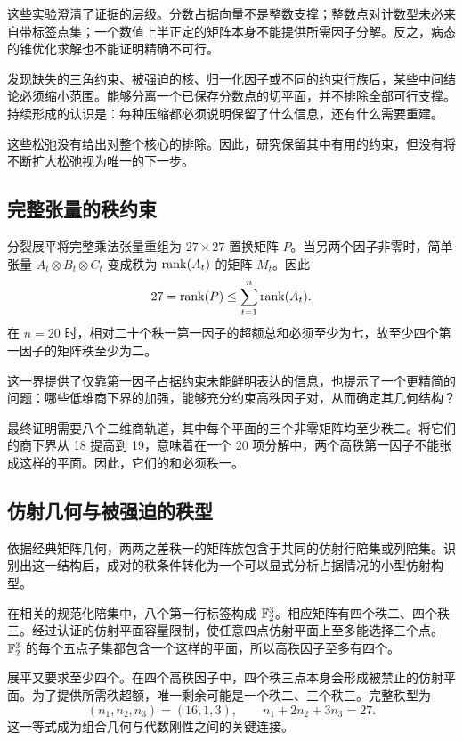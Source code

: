这些实验澄清了证据的层级。分数占据向量不是整数支撑；整数点对计数型未必来自带标签点集；一个数值上半正定的矩阵本身不能提供所需因子分解。反之，病态的锥优化求解也不能证明精确不可行。

发现缺失的三角约束、被强迫的核、归一化因子或不同的约束行族后，某些中间结论必须缩小范围。能够分离一个已保存分数点的切平面，并不排除全部可行支撑。持续形成的认识是：每种压缩都必须说明保留了什么信息，还有什么需要重建。

这些松弛没有给出对整个核心的排除。因此，研究保留其中有用的约束，但没有将不断扩大松弛视为唯一的下一步。

\subsection{完整张量的秩约束}\label{route:full}

分裂展平将完整乘法张量重组为 $27\times27$ 置换矩阵 $P$。当另两个因子非零时，简单张量 $A_t\otimes B_t\otimes C_t$ 变成秩为 $\operatorname{rank}(A_t)$ 的矩阵 $M_t$。因此
\[
 27=\operatorname{rank}(P)\le\sum_{t=1}^{n}\operatorname{rank}(A_t).
\]
在 $n=20$ 时，相对二十个秩一第一因子的超额总和必须至少为七，故至少四个第一因子的矩阵秩至少为二。

这一界提供了仅靠第一因子占据约束未能鲜明表达的信息，也提示了一个更精简的问题：哪些低维商下界的加强，能够充分约束高秩因子对，从而确定其几何结构？

最终证明需要八个二维商轨道，其中每个平面的三个非零矩阵均至少秩二。将它们的商下界从 18 提高到 19，意味着在一个 20 项分解中，两个高秩第一因子不能张成这样的平面。因此，它们的和必须秩一。

\subsection{仿射几何与被强迫的秩型}\label{route:geometry}

依据经典矩阵几何\cite{hua1945geometries,wan1996geometry}，两两之差秩一的矩阵族包含于共同的仿射行陪集或列陪集。识别出这一结构后，成对的秩条件转化为一个可以显式分析占据情况的小型仿射构型。

在相关的规范化陪集中，八个第一行标签构成 $\mathbb{F}_2^3$。相应矩阵有四个秩二、四个秩三。经过认证的仿射平面容量限制，使任意四点仿射平面上至多能选择三个点。$\mathbb{F}_2^3$ 的每个五点子集都包含一个这样的平面，所以高秩因子至多有四个。

展平又要求至少四个。在四个高秩因子中，四个秩三点本身会形成被禁止的仿射平面。为了提供所需秩超额，唯一剩余可能是一个秩二、三个秩三。完整秩型为
\[
 (n_1,n_2,n_3)=(16,1,3),\qquad
 n_1+2n_2+3n_3=27.
\]
这一等式成为组合几何与代数刚性之间的关键连接。

